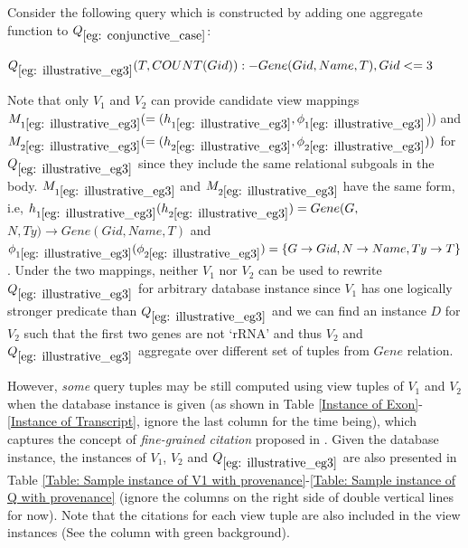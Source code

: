 \begin{example} \label{eg: illustrative_eg3}
Consider the following query which is constructed by adding one aggregate function to $Q_{\ref{eg: conjunctive_case}}$:
\begin{tabbing}
$Q_{\ref{eg: illustrative_eg3}}(T, COUNT(Gid)) :- Gene(Gid, Name, T), Gid <= 3$
\end{tabbing}
Note that only $V_1$ and $V_2$ can provide candidate view mappings $M_{1{\ref{eg: illustrative_eg3}}}(=(h_{1{\ref{eg: illustrative_eg3}}}, \phi_{1{\ref{eg: illustrative_eg3}}}$)) and $M_{2{\ref{eg: illustrative_eg3}}}(=(h_{2{\ref{eg: illustrative_eg3}}}, \phi_{2{\ref{eg: illustrative_eg3}}}))$ for $Q_{\ref{eg: illustrative_eg3}}$ since they include the same relational subgoals in the body. $M_{1{\ref{eg: illustrative_eg3}}}$ and $M_{2{\ref{eg: illustrative_eg3}}}$ have the same form, i.e, $h_{1\ref{eg: illustrative_eg3}}(h_{2\ref{eg: illustrative_eg3}}) = Gene(G,$ $N, Ty) \rightarrow Gene(Gid, Name, T)$ and $\phi_{1\ref{eg: illustrative_eg3}} (\phi_{2\ref{eg: illustrative_eg3}}) = \{G\rightarrow Gid, N \rightarrow Name, Ty\rightarrow T\}$. Under the two mappings, neither $V_1$  nor $V_2$ can be used to rewrite $Q_{\ref{eg: illustrative_eg3}}$ for arbitrary database instance since $V_1$ has one logically stronger predicate than $Q_{\ref{eg: illustrative_eg3}}$ and we can find an instance $D$ for $V_2$ such that the first two genes are not `rRNA' and thus $V_2$ and $Q_{\ref{eg: illustrative_eg3}}$ aggregate over different set of tuples from $Gene$ relation. 







However, {\em some} query tuples may be still computed using view tuples of $V_1$ and $V_2$ when the database instance is given (as shown in Table \ref{Instance of Exon}-\ref{Instance of Transcript}, ignore the last column for the time being), which captures the concept of {\em fine-grained citation} proposed in \cite{wu2018data}. Given the database instance, the instances of $V_1$, $V_2$ and $Q_{\ref{eg: illustrative_eg3}}$ are also presented in Table \ref{Table: Sample instance of V1 with provenance}-\ref{Table: Sample instance of Q with provenance} (ignore the columns on the right side of double vertical lines for now). Note that the citations for each view tuple are also included in the view instances (See the column with green background).



\end{example}
